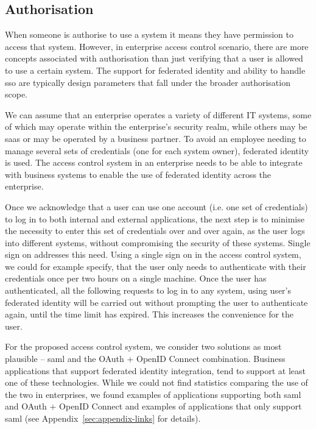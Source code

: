 \subsection{Authorisation}

When someone is authorise to use a system it means they have permission to access that system. However, in enterprise access control scenario, there are more concepts associated with authorisation than just verifying that a user is allowed to use a certain system. The support for federated identity and ability to handle \acrfull{sso} are typically design parameters that fall under the broader authorisation scope.

We can assume that an enterprise operates a variety of different IT systems, some of which may operate within the enterprise's security realm, while others may be \acrshort{saas} or may be operated by a business partner. To avoid an employee needing to manage several sets of credentials (one for each system owner), federated identity is used. The access control system in an enterprise needs to be able to integrate with business systems to enable the use of federated identity across the enterprise.

Once we acknowledge that a user can use one account (i.e. one set of credentials) to log in to both internal and external applications, the next step is to minimise the necessity to enter this set of credentials over and over again, as the user logs into different systems, without compromising the security of these systems. Single sign on addresses this need. Using a single sign on in the access control system, we could for example specify, that the user only needs to authenticate with their credentials once per two hours on a single machine. Once the user has authenticated, all the following requests to log in to any system, using user's federated identity will be carried out without prompting the user to authenticate again, until the time limit has expired. This increases the convenience for the user.

For the proposed access control system, we consider two solutions as most plausible -- \acrshort{saml} and the OAuth + OpenID Connect combination. Business applications that support federated identity integration, tend to support at least one of these technologies. While we could not find statistics comparing the use of the two in enterprises, we found examples of applications supporting both \acrshort{saml} and OAuth + OpenID Connect and examples of applications that only support \acrshort{saml} (see Appendix~\ref{sec:appendix-links} for details). 

